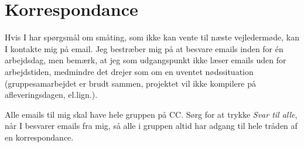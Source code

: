 \documentclass[12pt,a4paper,oneside,final]{article}
\begin{document}
\section{Korrespondance}
Hvis I har spørgsmål om småting, som ikke kan vente til næste vejledermøde, kan I kontakte mig på email.
Jeg bestræber mig på at besvare emails inden for \'en arbejdsdag, men bemærk, at jeg som udgangspunkt ikke læser emails uden for arbejdstiden, medmindre det drejer som om en uventet nødssituation (gruppesamarbejdet er brudt sammen, projektet vil ikke kompilere på afleveringsdagen, el.lign.).

Alle emails til mig skal have hele gruppen på CC.
Sørg for at trykke \emph{Svar til alle}, når I besvarer emails fra mig, så alle i gruppen altid har adgang til
hele tråden af en korrespondance.
\end{document}
